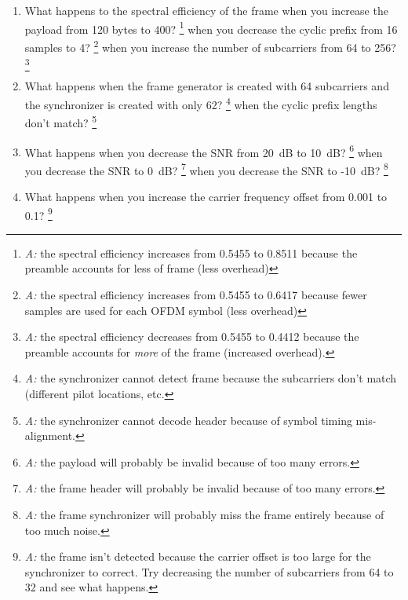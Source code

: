 \begin{enumerate}
\item What happens to the spectral efficiency of the frame when you
      increase the payload from 120 bytes to 400?%
      \footnote{{\em A:} the spectral efficiency increases from 0.5455
                to 0.8511 because the preamble accounts for less of
                frame (less overhead)}
      when you decrease the cyclic prefix from 16 samples to 4?%
      \footnote{{\em A:} the spectral efficiency increases from 0.5455
                to 0.6417 because fewer samples are used for each OFDM
                symbol (less overhead)}
      when you increase the number of subcarriers from 64 to 256?%
      \footnote{{\em A:} the spectral efficiency decreases from 0.5455
                to 0.4412 because the preamble accounts for {\em more} of
                the frame (increased overhead).}
\item What happens when the frame generator is created with 64
      subcarriers and the synchronizer is created with only 62?%
      \footnote{{\em A:} the synchronizer cannot detect frame
                because the subcarriers don't match (different pilot
                locations, etc.}
      when the cyclic prefix lengths don't match?%
      \footnote{{\em A:} the synchronizer cannot decode header because of
                symbol timing  mis-alignment.}
\item What happens when you decrease the SNR from 20~dB to 10~dB?%
      \footnote{{\em A:} the payload will probably be invalid because of
                too many errors.}
      when you decrease the SNR to 0~dB?%
      \footnote{{\em A:} the frame header will probably be invalid
                because of too many errors.}
      when you decrease the SNR to -10~dB?%
      \footnote{{\em A:} the frame synchronizer will probably miss the
                frame entirely because of too much noise.}
\item What happens when you increase the carrier frequency offset from
      0.001 to 0.1?%
      \footnote{{\em A:} the frame isn't detected because the carrier
                offset is too large for the synchronizer to correct.
                Try decreasing the number of subcarriers from 64 to 32
                and see what happens.}
\end{enumerate}


